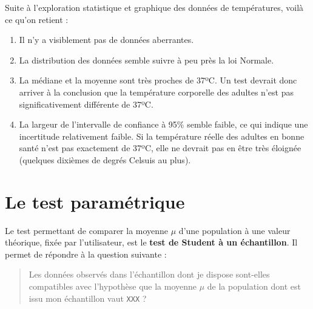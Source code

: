 \documentclass[
  a4paper,
  DIV=11,
  numbers=noendperiod,
  oneside]{scrreprt}
\providecommand{\tightlist}{%
  \setlength{\itemsep}{0pt}\setlength{\parskip}{0pt}}\usepackage{longtable,booktabs,array}
\begin{document}
\begin{tcolorbox}[enhanced jigsaw, breakable, toprule=.15mm, colbacktitle=quarto-callout-note-color!10!white, colframe=quarto-callout-note-color-frame, arc=.35mm, bottomtitle=1mm, opacityback=0, title=\textcolor{quarto-callout-note-color}{\faInfo}\hspace{0.5em}{Bilan des analyses préliminaires}, bottomrule=.15mm, colback=white, toptitle=1mm, rightrule=.15mm, leftrule=.75mm, opacitybacktitle=0.6, left=2mm, titlerule=0mm, coltitle=black]

Suite à l'exploration statistique et graphique des données de
températures, voilà ce qu'on retient :

\begin{enumerate}
\def\labelenumi{\arabic{enumi}.}
\tightlist
\item
  Il n'y a visiblement pas de données aberrantes.
\item
  La distribution des données semble suivre à peu près la loi Normale.
\item
  La médiane et la moyenne sont très proches de 37ºC. Un test devrait
  donc arriver à la conclusion que la température corporelle des adultes
  n'est pas significativement différente de 37ºC.
\item
  La largeur de l'intervalle de confiance à 95\% semble faible, ce qui
  indique une incertitude relativement faible. Si la température réelle
  des adultes en bonne santé n'est pas exactement de 37ºC, elle ne
  devrait pas en être très éloignée (quelques dixièmes de degrés Celsuis
  au plus).
\end{enumerate}

\end{tcolorbox}

\hypertarget{le-test-paramuxe9trique}{%
\section{Le test paramétrique}\label{le-test-paramuxe9trique}}

Le test permettant de comparer la moyenne \(\mu\) d'une population à une
valeur théorique, fixée par l'utilisateur, est le \textbf{test de
Student à un échantillon}. Il permet de répondre à la question suivante
:

\begin{quote}
Les données observés dans l'échantillon dont je dispose sont-elles
compatibles avec l'hypothèse que la moyenne \(\mu\) de la population
dont est issu mon échantillon vaut \texttt{XXX} ?
\end{quote}
\end{document}
